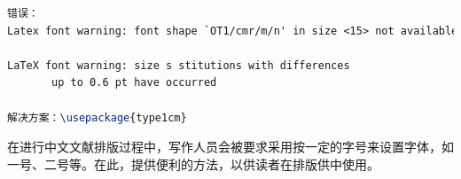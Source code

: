 \documentclass[12pt]{book}
\begin{document}


\begin{lstlisting}[language=tex,breaklines]
错误：
Latex font warning: font shape `OT1/cmr/m/n' in size <15> not available

LaTeX font warning: size s stitutions with differences
       up to 0.6 pt have occurred

解决方案：\usepackage{type1cm}

\end{lstlisting}

在进行中文文献排版过程中，写作人员会被要求采用按一定的字号来设置字体，如一号、二号等。在此，提供便利的方法，以供读者在排版供中使用。
\end{document}
